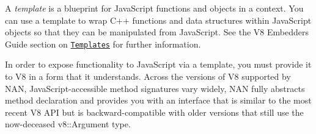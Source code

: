 A {\itshape template} is a blueprint for Java\+Script functions and objects in a context. You can use a template to wrap C++ functions and data structures within Java\+Script objects so that they can be manipulated from Java\+Script. See the V8 Embedders Guide section on \href{https://developers.google.com/v8/embed#templates}{\tt Templates} for further information.

In order to expose functionality to Java\+Script via a template, you must provide it to V8 in a form that it understands. Across the versions of V8 supported by N\+AN, Java\+Script-\/accessible method signatures vary widely, N\+AN fully abstracts method declaration and provides you with an interface that is similar to the most recent V8 A\+PI but is backward-\/compatible with older versions that still use the now-\/deceased {\ttfamily v8\+::\+Argument} type.


